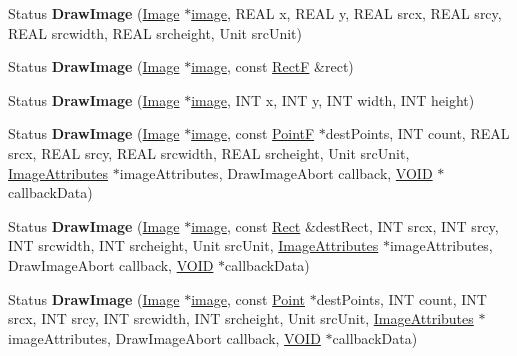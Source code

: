\begin{DoxyCompactItemize}
\item 
\mbox{\label{class_graphics_a31a0274f5fbc4f54625d654803b1349b}} 
Status {\bfseries Draw\+Image} (\hyperlink{class_image}{Image} $\ast$\hyperlink{interfacevoid}{image}, R\+E\+AL x, R\+E\+AL y, R\+E\+AL srcx, R\+E\+AL srcy, R\+E\+AL srcwidth, R\+E\+AL srcheight, Unit src\+Unit)
\item 
\mbox{\label{class_graphics_a22a1f408001663a2f2ce44096b9641ff}} 
Status {\bfseries Draw\+Image} (\hyperlink{class_image}{Image} $\ast$\hyperlink{interfacevoid}{image}, const \hyperlink{struct_rect_f}{RectF} \&rect)
\item 
\mbox{\label{class_graphics_a53a9d62d87b470ab7ee615cf03ec1ab0}} 
Status {\bfseries Draw\+Image} (\hyperlink{class_image}{Image} $\ast$\hyperlink{interfacevoid}{image}, I\+NT x, I\+NT y, I\+NT width, I\+NT height)
\item 
\mbox{\label{class_graphics_aa66f4868fb5e0c35439aa0c032c3baa3}} 
Status {\bfseries Draw\+Image} (\hyperlink{class_image}{Image} $\ast$\hyperlink{interfacevoid}{image}, const \hyperlink{struct_point_f}{PointF} $\ast$dest\+Points, I\+NT count, R\+E\+AL srcx, R\+E\+AL srcy, R\+E\+AL srcwidth, R\+E\+AL srcheight, Unit src\+Unit, \hyperlink{class_image_attributes}{Image\+Attributes} $\ast$image\+Attributes, Draw\+Image\+Abort callback, \hyperlink{interfacevoid}{V\+O\+ID} $\ast$callback\+Data)
\item 
\mbox{\label{class_graphics_a31f1143eaf443e03582d68a3dd42b2ab}} 
Status {\bfseries Draw\+Image} (\hyperlink{class_image}{Image} $\ast$\hyperlink{interfacevoid}{image}, const \hyperlink{struct_rect}{Rect} \&dest\+Rect, I\+NT srcx, I\+NT srcy, I\+NT srcwidth, I\+NT srcheight, Unit src\+Unit, \hyperlink{class_image_attributes}{Image\+Attributes} $\ast$image\+Attributes, Draw\+Image\+Abort callback, \hyperlink{interfacevoid}{V\+O\+ID} $\ast$callback\+Data)
\item 
\mbox{\label{class_graphics_a89bbd693f65ed8724053c0eeb638e089}} 
Status {\bfseries Draw\+Image} (\hyperlink{class_image}{Image} $\ast$\hyperlink{interfacevoid}{image}, const \hyperlink{struct_point}{Point} $\ast$dest\+Points, I\+NT count, I\+NT srcx, I\+NT srcy, I\+NT srcwidth, I\+NT srcheight, Unit src\+Unit, \hyperlink{class_image_attributes}{Image\+Attributes} $\ast$image\+Attributes, Draw\+Image\+Abort callback, \hyperlink{interfacevoid}{V\+O\+ID} $\ast$callback\+Data)

\end{DoxyCompactItemize}
